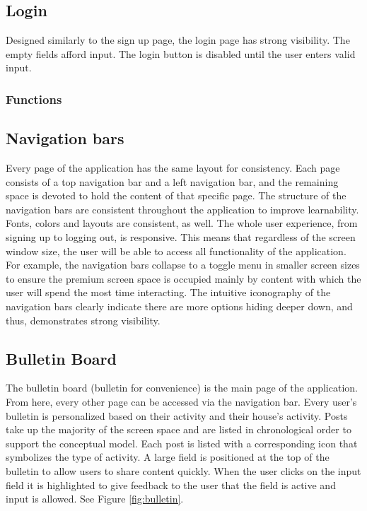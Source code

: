\documentclass[12pt]{article}
\begin{document}
\subsection{Login}
Designed similarly to the sign up page, the login page has strong visibility. The empty fields afford input. The login button is disabled until the user enters valid input.
\subsubsection{Functions}

\subsection{Navigation bars}
Every page of the application has the same layout for consistency. Each page consists of a top navigation bar and a left navigation bar, and the remaining space is devoted to hold the content of that specific page. The structure of the navigation bars are consistent throughout the application to improve learnability. Fonts, colors and layouts are consistent, as well. The whole user experience, from signing up to logging out, is responsive. This means that regardless of the screen window size, the user will be able to access all functionality of the application. For example, the navigation bars collapse to a toggle menu in smaller screen sizes to ensure the premium screen space is occupied mainly by content with which the user will spend the most time interacting. The intuitive iconography of the navigation bars clearly indicate there are more options hiding deeper down, and thus, demonstrates strong visibility.

\subsection{Bulletin Board}
The bulletin board (bulletin for convenience) is the main page of the application. From here, every other page can be accessed via the navigation bar. Every user's bulletin is personalized based on their activity and their house's activity. Posts take up the majority of the screen space and are listed in chronological order to support the conceptual model. Each post is listed with a corresponding icon that symbolizes the type of activity. A large field is positioned at the top of the bulletin to allow users to share content quickly. When the user clicks on the input field it is highlighted to give feedback to the user that the field is active and input is allowed. See Figure \ref{fig:bulletin}.
\end{document}
